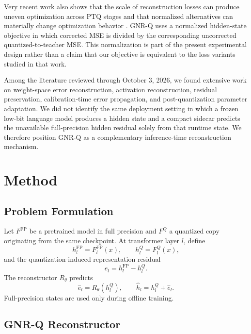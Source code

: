 \documentclass[11pt]{article}
\newcommand{\gnrq}{GNR-Q}
\begin{document}
Very recent work also shows that the scale of reconstruction losses can produce uneven optimization across PTQ stages and that normalized alternatives can materially change optimization behavior \cite{li2026loss}. GNR-Q uses a normalized hidden-state objective in which corrected MSE is divided by the corresponding uncorrected quantized-to-teacher MSE. This normalization is part of the present experimental design rather than a claim that our objective is equivalent to the loss variants studied in that work.

Among the literature reviewed through October 3, 2026, we found extensive work on weight-space error reconstruction, activation reconstruction, residual preservation, calibration-time error propagation, and post-quantization parameter adaptation. We did not identify the same deployment setting in which a frozen low-bit language model produces a hidden state and a compact sidecar predicts the unavailable full-precision hidden residual solely from that runtime state. We therefore position \gnrq{} as a complementary inference-time reconstruction mechanism.

\section{Method}

\subsection{Problem Formulation}

Let $F^{\mathrm{FP}}$ be a pretrained model in full precision and $F^Q$ a quantized copy originating from the same checkpoint. At transformer layer $l$, define
\begin{equation}
 h_l^{\mathrm{FP}} = F_l^{\mathrm{FP}}(x),
 \qquad
 h_l^Q = F_l^Q(x),
\end{equation}
and the quantization-induced representation residual
\begin{equation}
 e_l = h_l^{\mathrm{FP}} - h_l^Q.
\end{equation}
The reconstructor $R_\theta$ predicts
\begin{equation}
 \hat e_l = R_\theta(h_l^Q),
 \qquad
 \hat h_l = h_l^Q + \hat e_l.
\end{equation}
Full-precision states are used only during offline training.

\subsection{GNR-Q Reconstructor}
\end{document}
